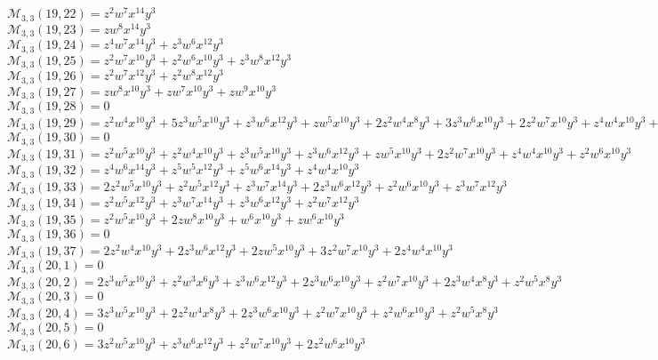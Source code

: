 $\mathcal{M}_{3,3}(19,22)=z^2w^7x^{14}y^3$\\
$\mathcal{M}_{3,3}(19,23)=zw^8x^{14}y^3$\\
$\mathcal{M}_{3,3}(19,24)=z^4w^7x^{14}y^3+z^3w^6x^{12}y^3$\\
$\mathcal{M}_{3,3}(19,25)=z^2w^7x^{10}y^3+z^2w^6x^{10}y^3+z^3w^8x^{12}y^3$\\
$\mathcal{M}_{3,3}(19,26)=z^2w^7x^{12}y^3+z^2w^8x^{12}y^3$\\
$\mathcal{M}_{3,3}(19,27)=zw^8x^{10}y^3+zw^7x^{10}y^3+zw^9x^{10}y^3$\\
$\mathcal{M}_{3,3}(19,28)=0$\\
$\mathcal{M}_{3,3}(19,29)=z^2w^4x^{10}y^3+5z^3w^5x^{10}y^3+z^3w^6x^{12}y^3+zw^5x^{10}y^3+2z^2w^4x^8y^3+3z^3w^6x^{10}y^3+2z^2w^7x^{10}y^3+z^4w^4x^{10}y^3+z^2w^5x^8y^3$\\
$\mathcal{M}_{3,3}(19,30)=0$\\
$\mathcal{M}_{3,3}(19,31)=z^2w^5x^{10}y^3+z^2w^4x^{10}y^3+z^3w^5x^{10}y^3+z^3w^6x^{12}y^3+zw^5x^{10}y^3+2z^2w^7x^{10}y^3+z^4w^4x^{10}y^3+z^2w^6x^{10}y^3$\\
$\mathcal{M}_{3,3}(19,32)=z^4w^6x^{14}y^3+z^5w^5x^{12}y^3+z^5w^6x^{14}y^3+z^4w^4x^{10}y^3$\\
$\mathcal{M}_{3,3}(19,33)=2z^2w^5x^{10}y^3+z^2w^5x^{12}y^3+z^3w^7x^{14}y^3+2z^3w^6x^{12}y^3+z^2w^6x^{10}y^3+z^3w^7x^{12}y^3$\\
$\mathcal{M}_{3,3}(19,34)=z^2w^5x^{12}y^3+z^3w^7x^{14}y^3+z^3w^6x^{12}y^3+z^2w^7x^{12}y^3$\\
$\mathcal{M}_{3,3}(19,35)=z^2w^5x^{10}y^3+2zw^8x^{10}y^3+w^6x^{10}y^3+zw^6x^{10}y^3$\\
$\mathcal{M}_{3,3}(19,36)=0$\\
$\mathcal{M}_{3,3}(19,37)=2z^2w^4x^{10}y^3+2z^3w^6x^{12}y^3+2zw^5x^{10}y^3+3z^2w^7x^{10}y^3+2z^4w^4x^{10}y^3$\\
$\mathcal{M}_{3,3}(20,1)=0$\\
$\mathcal{M}_{3,3}(20,2)=2z^3w^5x^{10}y^3+z^2w^3x^6y^3+z^3w^6x^{12}y^3+2z^3w^6x^{10}y^3+z^2w^7x^{10}y^3+2z^3w^4x^8y^3+z^2w^5x^8y^3$\\
$\mathcal{M}_{3,3}(20,3)=0$\\
$\mathcal{M}_{3,3}(20,4)=3z^3w^5x^{10}y^3+2z^2w^4x^8y^3+2z^3w^6x^{10}y^3+z^2w^7x^{10}y^3+z^2w^6x^{10}y^3+z^2w^5x^8y^3$\\
$\mathcal{M}_{3,3}(20,5)=0$\\
$\mathcal{M}_{3,3}(20,6)=3z^2w^5x^{10}y^3+z^3w^6x^{12}y^3+z^2w^7x^{10}y^3+2z^2w^6x^{10}y^3$\\
